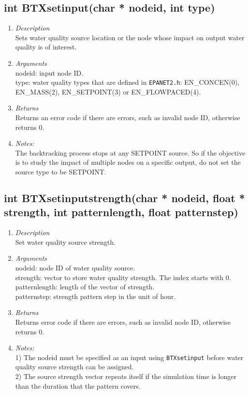 \documentclass[12pt,letterpaper]{article}
\begin{document}
\subsection*{int BTXsetinput(char * nodeid, int type)}
\begin{enumerate}
\item {\it Description}\\Sets water quality source location or the node whose impact on output water quality is of interest. \item {\it Arguments}
\\nodeid: input node ID.\\type: water quality types that are defined in
\texttt{EPANET2.h}: EN\_CONCEN(0), EN\_MASS(2), EN\_SETPOINT(3) or
EN\_FLOWPACED(4).
\item {\it Returns}\\Returns an error code if there are errors, such as invalid node ID, otherwise returns 0.
\item {\it Notes:}\\The backtracking process stops at any SETPOINT source.
So if the objective is to study the impact of multiple nodes on a
specific output, do not set the source type to be SETPOINT.
\end{enumerate}

\subsection*{int BTXsetinputstrength(char * nodeid, float * strength, int patternlength, float patternstep)}
\begin{enumerate}
\item {\it Description}\\Set water quality source strength.\item {\it Arguments}
\\nodeid: node ID of water quality source.\\strength: vector to store water
quality strength. The index starts with 0.\\patternlength: length of
the vector of strength.\\patternstep: strength pattern step in the
unit of hour.
\item {\it Returns}\\Returns error code if there are errors, such as invalid node ID, otherwise returns 0.
\item {\it Notes:}\\1) The nodeid must be specified as an input using \texttt{BTXsetinput} before water quality source strength can be
assigned.\\2) The source strength vector repeats itself if the
simulation time is longer than the duration that the pattern covers.
\end{enumerate}
\end{document}
